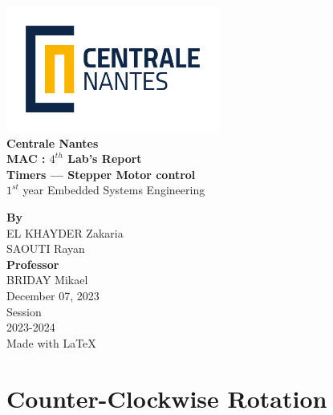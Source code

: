 \documentclass{article}
\begin{document}
\makeatletter
\begin{titlepage}
\begin{center}
    
\includegraphics[width=7cm]{assets/LogoCN_Q.png}
\\
\textbf{\large{Centrale Nantes}}
\\[2cm]

\textbf{\large{MAC : $4^{th}$ Lab's Report \\
Timers --- Stepper Motor control }}
\\[14pt]
$1^{st}$ year Embedded Systems Engineering
\\[2cm]


\vfill

\textbf{By} \\
EL KHAYDER Zakaria \\
SAOUTI Rayan
\\[1cm]

\textbf{Professor} \\
BRIDAY Mikael
\\[3cm]


December 07, 2023 \\ [12pt]

Session \\
2023-2024 \\[12pt]
\small{Made with \LaTeX}
\end{center}
\end{titlepage}
\makeatother

\pagebreak

\setcounter{page}{1}

\clearpage
{}
\tableofcontents

\clearpage
{}
\listoftables
{}
\lstlistoflistings

\clearpage

\setcounter{page}{1}

\section{Counter-Clockwise Rotation}
\end{document}
